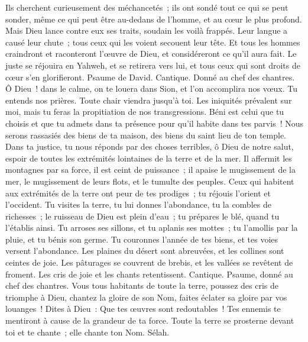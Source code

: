 \begin{multicols}{2}
Ils cherchent curieusement des méchancetés~; ils ont sondé tout ce qui se peut sonder, même ce qui peut être au-dedans de l'homme, et au cœur le plus profond.
Mais Dieu lance contre eux ses traits, soudain les voilà frappés.
Leur langue a causé leur chute~; tous ceux qui les voient secouent leur tête.
Et tous les hommes craindront et raconteront l'œuvre de Dieu, et considéreront ce qu'il aura fait.
Le juste se réjouira en Yahweh, et se retirera vers lui, et tous ceux qui sont droits de cœur s'en glorifieront.
\VerseOne{}Psaume de David. Cantique. Donné au chef des chantres.
Ô Dieu~! dans le calme, on te louera dans Sion, et l'on accomplira nos vœux.
Tu entends nos prières. Toute chair viendra jusqu'à toi.
Les iniquités prévalent sur moi, mais tu feras la propitiation de nos transgressions.
Béni est celui que tu choisis et que tu admets dans ta présence pour qu'il habite dans tes parvis~! Nous serons rassasiés des biens de ta maison, des biens du saint lieu de ton temple.
Dans ta justice, tu nous réponds par des choses terribles, ô Dieu de notre salut, espoir de toutes les extrémités lointaines de la terre et de la mer.
Il affermit les montagnes par sa force, il est ceint de puissance~;
il apaise le mugissement de la mer, le mugissement de leurs flots, et le tumulte des peuples.
Ceux qui habitent aux extrémités de la terre ont peur de tes prodiges~; tu réjouis l'orient et l'occident.
Tu visites la terre, tu lui donnes l'abondance, tu la combles de richesses~; le ruisseau de Dieu est plein d'eau~; tu prépares le blé, quand tu l'établis ainsi.
Tu arroses ses sillons, et tu aplanis ses mottes~; tu l'amollis par la pluie, et tu bénis son germe.
Tu couronnes l'année de tes biens, et tes voies versent l'abondance.
Les plaines du désert sont abreuvées, et les collines sont ceintes de joie.
Les pâturages se couvrent de brebis, et les vallées se revêtent de froment. Les cris de joie et les chants retentissent.
\VerseOne{}Cantique. Psaume, donné au chef des chantres. Vous tous habitants de toute la terre, poussez des cris de triomphe à Dieu,
chantez la gloire de son Nom, faites éclater sa gloire par vos louanges~!
Dites à Dieu~: Que tes œuvres sont redoutables~! Tes ennemis te mentiront à cause de la grandeur de ta force.
Toute la terre se prosterne devant toi et te chante~; elle chante ton Nom. Sélah.

\end{multicols}
